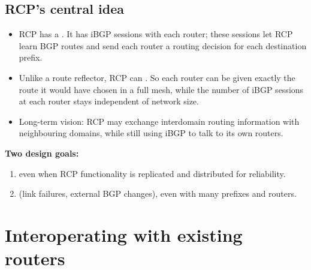 \subsection{RCP's central idea}
\begin{itemize}
\item RCP has a . It has iBGP sessions with each router; these sessions let RCP learn BGP routes and send each router a routing decision for each destination prefix.
\item Unlike a route reflector, RCP can . So each router can be given exactly the route it would have chosen in a full mesh, while the number of iBGP sessions at each router stays independent of network size.
\item Long-term vision: RCP may exchange interdomain routing information with neighbouring domains, while still using iBGP to talk to its own routers.
\end{itemize}
\textbf{Two design goals:}
\begin{enumerate}
\item {} even when RCP functionality is replicated and distributed for reliability.
\item {} (link failures, external BGP changes), even with many prefixes and routers.
\end{enumerate}

\section{Interoperating with existing routers}

